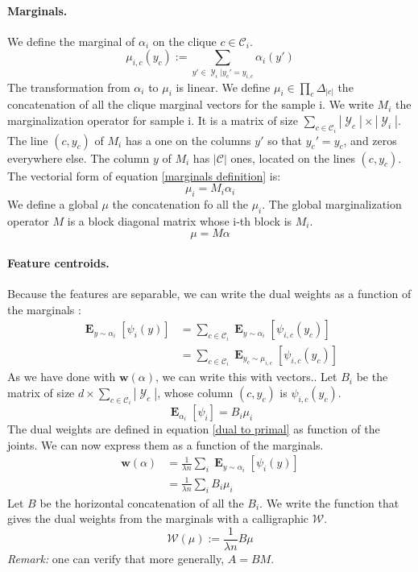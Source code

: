 \documentclass{article}
\DeclareMathOperator{\1}{\mathbb{1}}
\DeclareMathOperator{\E}{\mathbf{E}}
\DeclareMathOperator{\Y}{\mathcal{Y}}
\begin{document}
\paragraph{Marginals.}
We define the marginal of $\alpha_i$ on the clique $c \in \mathcal C_i$.
\begin{equation}
	\label{marginals definition}
	\mu_{i, c}(y_c) := \sum_{y'\in \Y_i | y_c' = y_{i, c}} \alpha_i(y')
\end{equation}
The transformation from $\alpha_i$ to $\mu_i$ is linear.
We define $\mu_i \in \prod_c \Delta_|c|$ the concatenation of all the clique marginal vectors for the sample i.
We write $M_i$ the marginalization operator for sample i.
It is a matrix of size $\sum_{c \in \mathcal C_i} |\Y_c| \times |\Y_i |$.
The line $(c, y_c)$ of $M_i$ has a one on the columns $y'$ so that $y_c'=y_c$, and zeros everywhere else.
The column $y$ of $M_i$ has $|\mathcal C|$ ones, located on the lines $(c, y_c)$.
The vectorial form of equation \ref{marginals definition} is:
\begin{equation*}
	\mu_i = M_i \alpha_i
\end{equation*}
We define a global $\mu$ the concatenation fo all the $\mu_i$.
The global marginalization operator $M$ is a block diagonal matrix whose i-th block is $M_i$.
\begin{equation}
	\label{marginals vectorial}
	\mu = M \alpha
\end{equation} 

\paragraph{Feature centroids.}
Because the features are separable, we can write the dual weights as a function of the marginals :
\begin{align*}
	\E_{y \sim \alpha_i}[\psi_i(y)]
   	&  = \sum_{c \in \mathcal C_i} \E_{y \sim \alpha_i}  [\psi_{i, c}(y_c)]  \\
   	&  = \sum_{c \in \mathcal C_i} \E_{y_c \sim \mu_{i, c}}  [\psi_{i, c}(y_c)] 
\end{align*}
As we have done with $\bm w(\alpha)$, we can write this with vectors..
Let  $B_i$ be the matrix of size $d \times  \sum_{c \in \mathcal C_i} |\Y_c|$, whose column $(c, y_c)$ is $\psi_{i, c}(y_c)$.
\begin{equation*}
	 \E_{\alpha_i}[\psi_i] = B_i \mu_i
\end{equation*}
The dual weights are defined in equation \ref{dual to primal} as function of the joints. We can now express them as a function of the marginals.
\begin{align*}
	\bm w (\alpha)
	& =\frac{1}{\lambda n} \sum_i \E_{y \sim \alpha_i}[\psi_i(y)] \\
	& = \frac{1}{\lambda n} \sum_i B_i \mu_i
\end{align*}
Let $B$ be the horizontal concatenation of all the $B_i$. We write the function that gives the dual weights from the marginals with a calligraphic $\mathcal W$.
\begin{equation}
	\label{marginals to primal}
	\mathcal W (\mu) := \frac{1}{\lambda n} B \mu
\end{equation}
\textit{Remark:} one can verify that more generally, $A=BM$.
\end{document}
